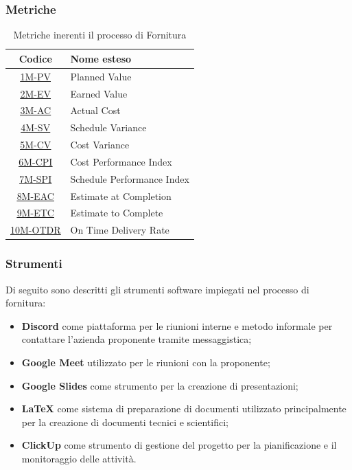 \subsubsection{Metriche}
\begin{table}[!h]
	\centering
	\begin{tabular}{ | c | l | }
		\hline
		\textbf{Codice}                       & \textbf{Nome esteso}       \\
		\hline
		\underline{\hyperlink{1M}{1M-PV}}     & Planned Value              \\
		\underline{\hyperlink{2M}{2M-EV}}     & Earned Value               \\
		\underline{\hyperlink{3M}{3M-AC}}     & Actual Cost                \\
		\underline{\hyperlink{4M}{4M-SV}}     & Schedule Variance          \\
		\underline{\hyperlink{5M}{5M-CV}}     & Cost Variance              \\
		\underline{\hyperlink{6M}{6M-CPI}}    & Cost Performance Index     \\
		\underline{\hyperlink{7M}{7M-SPI}}    & Schedule Performance Index \\
		\underline{\hyperlink{8M}{8M-EAC}}    & Estimate at Completion     \\
		\underline{\hyperlink{9M}{9M-ETC}}    & Estimate to Complete       \\
		\underline{\hyperlink{10M}{10M-OTDR}} & On Time Delivery Rate      \\
		\hline
	\end{tabular}
	\caption{Metriche inerenti il processo di Fornitura}
\end{table}

\subsubsection{Strumenti}
Di seguito sono descritti gli strumenti software impiegati nel processo di fornitura:
\begin{itemize}
	\item \textbf{Discord} come piattaforma per le riunioni interne e metodo informale per contattare l'azienda proponente tramite messaggistica;
	\item \textbf{Google Meet} utilizzato per le riunioni con la proponente;
	\item \textbf{Google Slides} come strumento per la creazione di presentazioni;
	\item \textbf{LaTeX} come sistema di preparazione di documenti utilizzato principalmente per la creazione di documenti tecnici e scientifici;
	\item \textbf{ClickUp} come strumento di gestione del progetto per la pianificazione e il monitoraggio delle attività.
\end{itemize}

